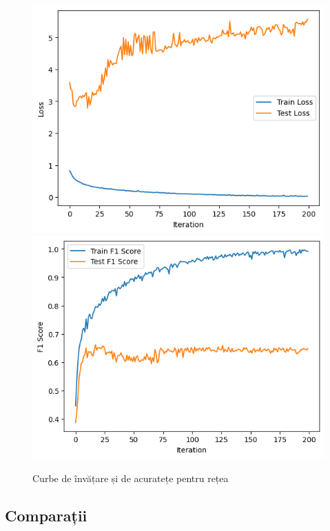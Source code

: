 \documentclass{article}
\begin{document}
\begin{figure}[htb]
    \centering
    \includegraphics[scale=0.5]{news_popularity/learning/loss.png}
    \includegraphics[scale=0.5]{news_popularity/learning/f1.png}
    \caption{Curbe de învățare și de acuratețe pentru rețea}
    \label{fig:news:nn_loss}
\end{figure}

\subsection{Comparații}
\end{document}
